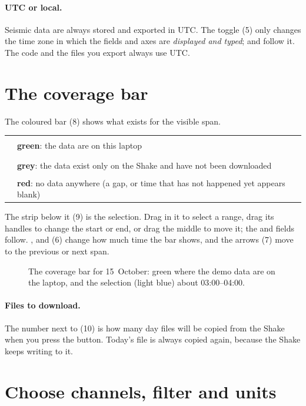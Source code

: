 \paragraph{UTC or local.} Seismic data are always stored and exported in UTC. The toggle (5) only changes the time zone in which the
fields and axes are \emph{displayed and typed};  and  follow it. The code and the files you export always use UTC.

\section{The coverage bar}
The coloured bar (8) shows what exists for the visible span.
\begin{center}\small
\begin{tabular}{@{}cl@{}}
\textcolor{rs3dgreen}{\rule{1.2em}{1ex}} & \textbf{green}: the data are on this laptop\\
\textcolor{rs3dgrey}{\rule{1.2em}{1ex}} & \textbf{grey}: the data exist only on the Shake and have not been downloaded\\
\textcolor{rs3dred}{\rule{1.2em}{1ex}} & \textbf{red}: no data anywhere (a gap, or time that has not happened yet appears blank)\\
\end{tabular}
\end{center}

The strip below it (9) is the selection. Drag in it to select a range, drag its handles to change the start or end, or drag the
middle to move it; the  and  fields follow. ,  and  (6) change how much time the bar shows, and
the arrows (7) move to the previous or next span.

\begin{figure}[tbp]
\centering
{}
\caption{The coverage bar for 15~October: green where the demo data are on the laptop, and the selection (light blue) about 03:00--04:00.}
\end{figure}

\paragraph{Files to download.} The number next to (10) is how many day files will be copied from the Shake when you press the
button. Today's file is always copied again, because the Shake keeps writing to it.

\section{Choose channels, filter and units}
